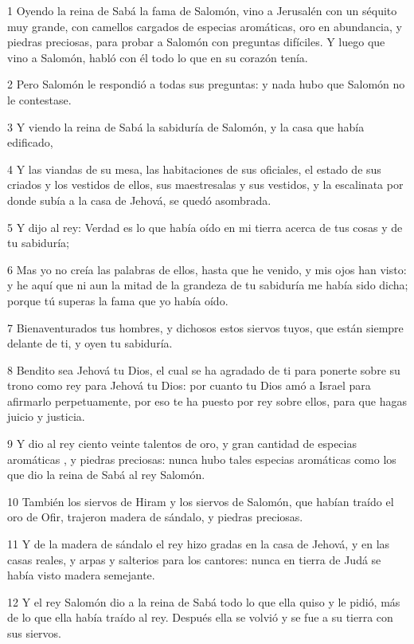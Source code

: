 \par 1 Oyendo la reina de Sabá la fama de Salomón, vino a Jerusalén  con un séquito muy grande, con camellos cargados de especias aromáticas, oro en abundancia, y piedras preciosas, para probar a Salomón con preguntas difíciles. Y luego que vino a Salomón, habló con él todo lo que en su corazón tenía.
\par 2 Pero Salomón le respondió a todas sus preguntas: y nada hubo que Salomón no le contestase.
\par 3 Y viendo la reina de Sabá la sabiduría de Salomón, y la casa que había edificado,
\par 4 Y las viandas de su mesa, las habitaciones de sus oficiales, el estado de sus criados y los vestidos de ellos, sus maestresalas y sus vestidos, y la escalinata por donde subía a la casa de Jehová, se quedó asombrada.
\par 5 Y dijo al rey: Verdad es lo que había oído en mi tierra acerca de tus cosas y de tu sabiduría;
\par 6 Mas yo no creía las palabras de ellos, hasta que he venido, y mis ojos han visto: y he aquí que ni aun la mitad de la grandeza de tu sabiduría me había sido dicha; porque tú superas la fama que yo había oído.
\par 7 Bienaventurados tus hombres, y dichosos estos siervos tuyos, que están siempre delante de ti, y oyen tu sabiduría.
\par 8 Bendito sea Jehová tu Dios, el cual se ha agradado de ti para ponerte sobre su trono como rey para Jehová tu Dios: por cuanto tu Dios amó a Israel para afirmarlo perpetuamente, por eso te ha puesto por rey sobre ellos, para que hagas juicio y justicia.
\par 9 Y dio al rey ciento veinte talentos de oro,  y gran cantidad de especias aromáticas , y piedras preciosas: nunca hubo tales especias aromáticas  como los que dio la reina de Sabá al rey Salomón. 
\par 10 También los siervos de Hiram y los siervos de Salomón, que habían traído el oro de Ofir, trajeron madera de sándalo, y piedras preciosas.
\par 11 Y  de la madera de sándalo el rey hizo gradas en la casa de Jehová, y en las casas reales, y arpas y salterios para los cantores: nunca en tierra de Judá se había visto madera semejante.
\par 12 Y el rey Salomón dio a la reina de Sabá todo lo que ella quiso y le pidió, más de lo que ella había traído al rey. Después ella se volvió y se fue a su tierra con sus siervos.

